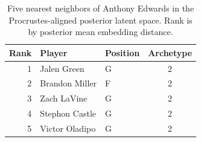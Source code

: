 \begin{table}[htbp]
  \centering\small
  \begin{tabular}{rllc}
    \toprule
    Rank & Player & Position & Archetype \\
    \midrule
    1 & Jalen Green & G & 2 \\
    2 & Brandon Miller & F & 2 \\
    3 & Zach LaVine & G & 2 \\
    4 & Stephon Castle & G & 2 \\
    5 & Victor Oladipo & G & 2 \\
    \bottomrule
  \end{tabular}
  \caption{Five nearest neighbors of Anthony Edwards in the Procrustes-aligned posterior latent space. Rank is by posterior mean embedding distance.}
  \label{tab:Anthony_Edwards_neighbors}
\end{table}

